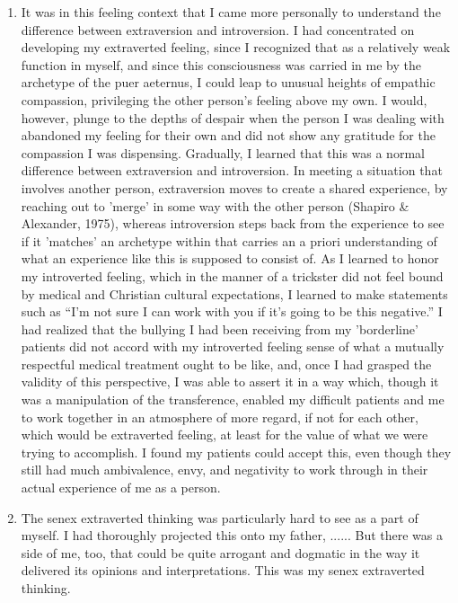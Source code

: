 \begin{enumerate}
    \item {} It was in this feeling context that I
        came more personally to understand the difference between extraversion
        and introversion. I had concentrated on developing my extraverted
        feeling, since I recognized that as a relatively weak function in
        myself, and since this consciousness was carried in me by the archetype
        of the puer aeternus, I could leap to unusual heights of empathic
        compassion, privileging the other person's feeling above my own. I
        would, however, plunge to the depths of despair when the person I was
        dealing with abandoned my feeling for their own and did not show any
        gratitude for the compassion I was dispensing. Gradually, I learned
        that this was a normal difference between extraversion and
        introversion. In meeting a situation that involves another person,
        extraversion moves to create a shared experience, by reaching out to
        'merge' in some way with the other person (Shapiro \& Alexander, 1975),
        whereas introversion steps back from the experience to see if it
        'matches' an archetype within that carries an a priori understanding of
        what an experience like this is supposed to consist of. As I learned to
        honor my introverted feeling, which in the manner of a trickster did
        not feel bound by medical and Christian cultural expectations, I
        learned to make statements such as ``I'm not sure I can work with you if
        it's going to be this negative.'' I had realized that the bullying I had
        been receiving from my 'borderline' patients did not accord with my
        introverted feeling sense of what a mutually respectful medical
        treatment ought to be like, and, once I had grasped the validity of
        this perspective, I was able to assert it in a way which, though it was
        a manipulation of the transference, enabled my difficult patients and
        me to work together in an atmosphere of more regard, if not for each
        other, which would be extraverted feeling, at least for the value of
        what we were trying to accomplish. I found my patients could accept
        this, even though they still had much ambivalence, envy, and negativity
        to work through in their actual experience of me as a person.

    \item {} The senex extraverted thinking was particularly
        hard to see as a part of myself. I had thoroughly projected this onto
        my father, ...... But there was a side of me, too, that could be quite
        arrogant and dogmatic in the way it delivered its opinions and
        interpretations. This was my senex extraverted thinking.


\end{enumerate}
